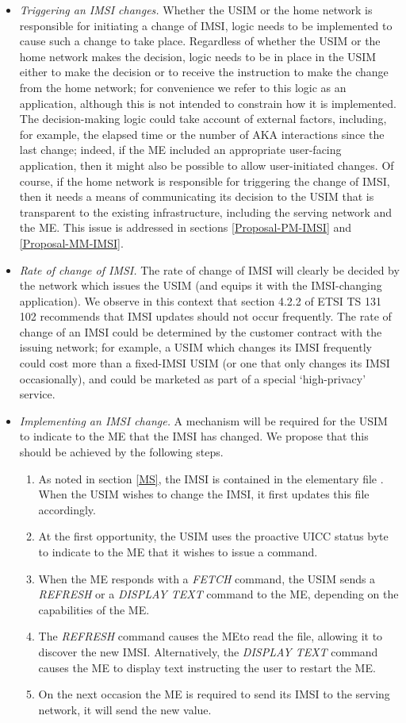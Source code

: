 \documentclass{acm_proc_article-sp}
\begin{document}
\begin{itemize}
\item \emph{Triggering an IMSI changes.} Whether the USIM or the home network is responsible for initiating a change of IMSI, logic needs to be implemented to cause such a change to take place. Regardless of whether the USIM or the home network makes the decision, logic needs to be in place in the USIM either to make the decision or to receive the instruction to make the change from the home network; for convenience we refer to this logic as an application, although this is not intended to constrain how it is implemented. The decision-making logic could take account of external factors, including, for example, the elapsed time or the number of AKA interactions since the last change; indeed, if the ME included an appropriate user-facing application, then it might also be possible to allow user-initiated changes. Of course, if the home network is responsible for triggering the change of IMSI, then it needs a means of communicating its decision to the USIM that is transparent to the existing infrastructure, including the serving network and the ME. This issue is addressed in sections \ref{Proposal-PM-IMSI} and \ref{Proposal-MM-IMSI}.

\item \emph{Rate of change of IMSI.} The rate of change of IMSI will clearly be decided by the network which issues the USIM (and equips it with the IMSI-changing application). We observe in this context that section 4.2.2 of ETSI TS 131 102 \cite{ETSI_TS_131_102} recommends that IMSI updates should not occur frequently. The rate of change of an IMSI could be determined by the customer contract with the issuing network; for example, a USIM which changes its IMSI frequently could cost more than a fixed-IMSI USIM (or one that only changes its IMSI occasionally), and could be marketed as part of a special `high-privacy' service.

\item \emph{Implementing an IMSI change.} A mechanism will be required for the USIM to indicate to the ME that the IMSI has changed.  We propose that this should be achieved by the following steps.
\begin{enumerate}

\item As noted in section \ref{MS}, the IMSI is contained in the elementary file \emph{}. When the USIM wishes to change the IMSI, it first updates this file accordingly.
\item At the first opportunity, the USIM uses the proactive UICC status byte to indicate to the ME that it wishes to issue a command.
\item When the ME responds with a \emph{FETCH} command, the USIM sends a \emph{REFRESH} or a \emph{DISPLAY TEXT} command to the ME, depending on the capabilities of the ME.
\item The \emph{REFRESH} command causes the ME\@ to read the \emph{} file, allowing it to discover the new IMSI. Alternatively, the \emph{DISPLAY TEXT} command causes the ME to display text instructing the user to restart the ME.
\item On the next occasion the ME is required to send its IMSI to the serving network, it will send the new value.


\end{enumerate}
\end{itemize}
\end{document}
